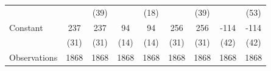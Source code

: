 \begin{table}[htbp]
\begin{tabular}{l*{8}{c}}
                    &                     &        (39)         &                     &        (18)         &                     &        (39)         &                     &        (53)         \\\addlinespace
Constant            &         237\sym{***}&         237\sym{***}&          94\sym{***}&          94\sym{***}&         256\sym{***}&         256\sym{***}&        -114\sym{***}&        -114\sym{***}\\
                    &        (31)         &        (31)         &        (14)         &        (14)         &        (31)         &        (31)         &        (42)         &        (42)         \\
\midrule
Observations        &        1868         &        1868         &        1868         &        1868         &        1868         &        1868         &        1868         &        1868         \\
\bottomrule
\end{tabular}
\end{table}

